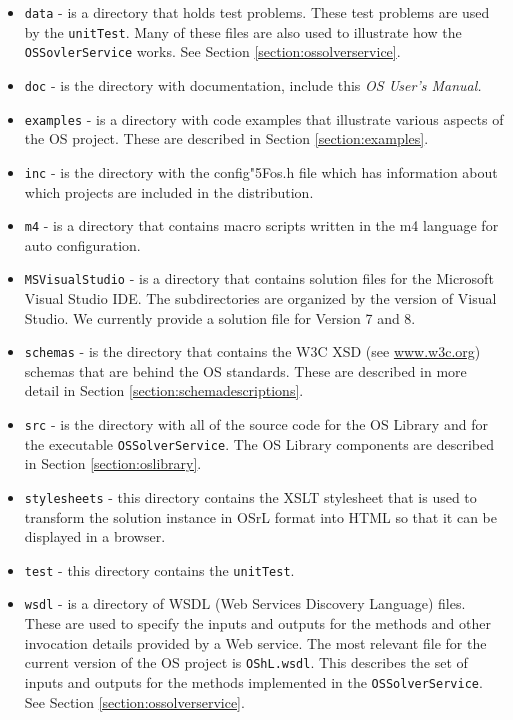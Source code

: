 \documentclass[11pt]{article}
\renewcommand{\_}{{\char"5F}}
\renewcommand{\{}{{\char"7B}}
\renewcommand{\}}{{\char"7D}}
\renewcommand{\^}{{\char"0D}}
\renewcommand{\'}{{\char"0D}}
\begin{document}
\begin{itemize}

\item {\tt data} - is a directory that holds test problems. These test problems are used by the {\tt unitTest}. Many of these files are also used to illustrate how the {\tt OSSovlerService} works. See Section \ref{section:ossolverservice}.

\item {\tt doc} - is the directory with documentation, include this {\it OS User's Manual.}

\item {\tt examples} - is a directory with code examples that illustrate various aspects of the OS project.    These are described in Section \ref{section:examples}.

\item {\tt inc} - is the directory with the config\_os.h file which has information about which projects are included in the distribution.

\item {\tt m4} - is a directory that  contains macro scripts written in the m4 language for auto configuration.

\item {\tt MSVisualStudio} - is a directory that  contains solution files for the Microsoft Visual Studio IDE.  The subdirectories are organized by the version of Visual Studio. We currently provide a solution file for Version 7 and 8.

\item {\tt schemas} - is the directory that contains the W3C XSD (see \url{www.w3c.org}) schemas that are behind the OS standards. These are described in more detail in Section \ref{section:schemadescriptions}.

\item {\tt src} - is the directory with all of the source code for the OS Library and for the executable {\tt OSSolverService}. The OS Library components are described in Section \ref{section:oslibrary}.

\item {\tt stylesheets} - this directory contains the XSLT stylesheet that is used to transform the solution instance in OSrL format into HTML so that it can be displayed in a browser.

\item {\tt test} - this directory contains the {\tt unitTest}.


\item  {\tt wsdl} - is a directory of WSDL (Web Services Discovery Language) files. These are used to specify the inputs and outputs for the methods and other invocation details provided by a Web service. The most relevant file for the current version of the OS project is {\tt OShL.wsdl}.  This describes the set of inputs and outputs for the methods implemented in the {\tt OSSolverService}. See Section \ref{section:ossolverservice}.

\end{itemize}
\end{document}
